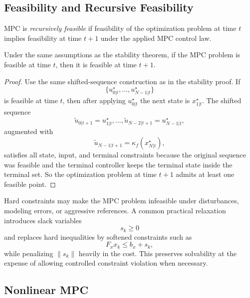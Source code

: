 \subsection{Feasibility and Recursive Feasibility}
\label{sec:l9-feasibility-and-recursive-feasibility}

\begin{definition}\label{def:l9-recursive-feasibility}
	MPC is \emph{recursively feasible} if feasibility of the optimization problem at time $t$ implies feasibility at time $t+1$ under the applied MPC control law.
\end{definition}

\begin{proposition}\label{prop:l9-terminal-constraint-ensures-recursive-feasibility}
	Under the same assumptions as the stability theorem, if the MPC problem is feasible at time $t$, then it is feasible at time $t+1$.
\end{proposition}
\begin{proof}
	Use the same shifted-sequence construction as in the stability proof. If
	\[
		\{u_{0|t}^\star,\dots,u_{N-1|t}^\star\}
	\]
	is feasible at time $t$, then after applying $u_{0|t}^\star$ the next state is $x_{1|t}^\star$. The shifted sequence
	\[
		\tilde u_{0|t+1}=u_{1|t}^\star,\dots,\tilde u_{N-2|t+1}=u_{N-1|t}^\star,
	\]
	augmented with
	\[
		\tilde u_{N-1|t+1}=\kappa_f(x_{N|t}^\star),
	\]
	satisfies all state, input, and terminal constraints because the original sequence was feasible and the terminal controller keeps the terminal state inside the terminal set. So the optimization problem at time $t+1$ admits at least one feasible point.
\end{proof}

\begin{remark}
	Hard constraints may make the MPC problem infeasible under disturbances, modeling errors, or aggressive references. A common practical relaxation introduces slack variables
	\[
		s_k \ge 0
	\]
	and replaces hard inequalities by softened constraints such as
	\[
		F_x x_k \le b_x + s_k,
	\]
	while penalizing $\|s_k\|$ heavily in the cost. This preserves solvability at the expense of allowing controlled constraint violation when necessary.
\end{remark}

\subsection{Nonlinear MPC}
\label{sec:l9-nonlinear-mpc}

